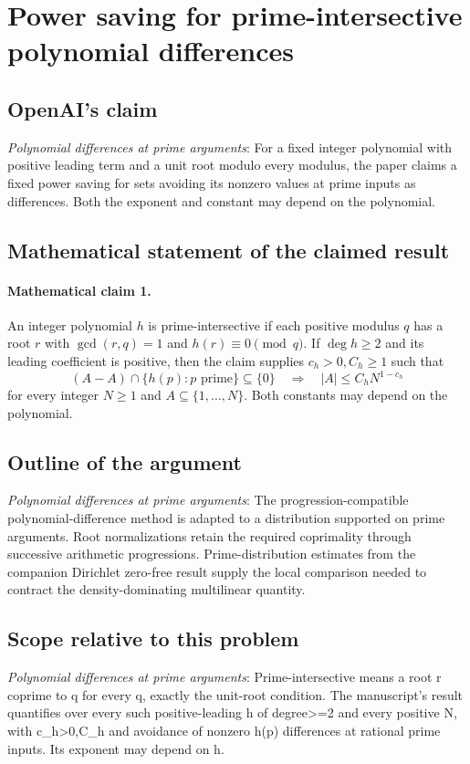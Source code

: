 \documentclass[11pt]{article}
\begin{document}
\section*{Power saving for prime-intersective polynomial differences}

\subsection{OpenAI's claim}
\textit{Polynomial differences at prime arguments}: For a fixed integer polynomial with positive leading term and a unit root modulo every modulus, the paper claims a fixed power saving for sets avoiding its nonzero values at prime inputs as differences. Both the exponent and constant may depend on the polynomial.

\subsection{Mathematical statement of the claimed result}
\paragraph{Mathematical claim 1.} An integer polynomial $h$ is prime-intersective if each positive modulus $q$ has a root $r$ with $\gcd(r,q)=1$ and $h(r)\equiv0\pmod q$. If $\deg h\ge2$ and its leading coefficient is positive, then the claim supplies $c_h>0,C_h\ge1$ such that \[(A-A)\cap\{h(p):p\text{ prime}\}\subseteq\{0\}\quad\Longrightarrow\quad|A|\le C_hN^{1-c_h}\] for every integer $N\ge1$ and $A\subseteq\{1,\ldots,N\}$. Both constants may depend on the polynomial.

\subsection{Outline of the argument}
\textit{Polynomial differences at prime arguments}: The progression-compatible polynomial-difference method is adapted to a distribution supported on prime arguments. Root normalizations retain the required coprimality through successive arithmetic progressions. Prime-distribution estimates from the companion Dirichlet zero-free result supply the local comparison needed to contract the density-dominating multilinear quantity.

\subsection{Scope relative to this problem}
\textit{Polynomial differences at prime arguments}: Prime-intersective means a root r coprime to q for every q, exactly the unit-root condition. The manuscript’s result quantifies over every such positive-leading h of degree>=2 and every positive N, with c\_h>0,C\_h and avoidance of nonzero h(p) differences at rational prime inputs. Its exponent may depend on h.
\end{document}
